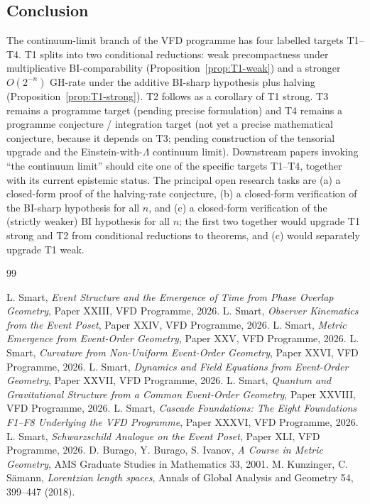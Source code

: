 \documentclass[12pt]{article}
\theoremstyle{definition}
\theoremstyle{remark}
\begin{document}
\subsection{Conclusion}

The continuum-limit branch of the VFD programme has four labelled targets T1--T4. T1 splits into two conditional reductions: weak precompactness under multiplicative BI-comparability (Proposition~\ref{prop:T1-weak}) and a stronger $O(2^{-n})$ GH-rate under the additive BI-sharp hypothesis plus halving (Proposition~\ref{prop:T1-strong}). T2 follows as a corollary of T1 strong. T3 remains a programme target (pending precise formulation) and T4 remains a programme conjecture / integration target (not yet a precise mathematical conjecture, because it depends on T3; pending construction of the tensorial upgrade and the Einstein-with-$\Lambda$ continuum limit). Downstream papers invoking ``the continuum limit'' should cite one of the specific targets T1--T4, together with its current epistemic status. The principal open research tasks are (a) a closed-form proof of the halving-rate conjecture, (b) a closed-form verification of the BI-sharp hypothesis for all $n$, and (c) a closed-form verification of the (strictly weaker) BI hypothesis for all $n$; the first two together would upgrade T1 strong and T2 from conditional reductions to theorems, and (c) would separately upgrade T1 weak.


\begin{thebibliography}{99}

 L. Smart, \emph{Event Structure and the Emergence of Time from Phase Overlap Geometry}, Paper XXIII, VFD Programme, 2026.
 L. Smart, \emph{Observer Kinematics from the Event Poset}, Paper XXIV, VFD Programme, 2026.
 L. Smart, \emph{Metric Emergence from Event-Order Geometry}, Paper XXV, VFD Programme, 2026.
 L. Smart, \emph{Curvature from Non-Uniform Event-Order Geometry}, Paper XXVI, VFD Programme, 2026.
 L. Smart, \emph{Dynamics and Field Equations from Event-Order Geometry}, Paper XXVII, VFD Programme, 2026.
 L. Smart, \emph{Quantum and Gravitational Structure from a Common Event-Order Geometry}, Paper XXVIII, VFD Programme, 2026.
 L. Smart, \emph{Cascade Foundations: The Eight Foundations F1--F8 Underlying the VFD Programme}, Paper XXXVI, VFD Programme, 2026.
 L. Smart, \emph{Schwarzschild Analogue on the Event Poset}, Paper XLI, VFD Programme, 2026.
 D. Burago, Y. Burago, S. Ivanov, \emph{A Course in Metric Geometry}, AMS Graduate Studies in Mathematics 33, 2001.
 M. Kunzinger, C. S\"amann, \emph{Lorentzian length spaces}, Annals of Global Analysis and Geometry 54, 399--447 (2018).

\end{thebibliography}
\end{document}
